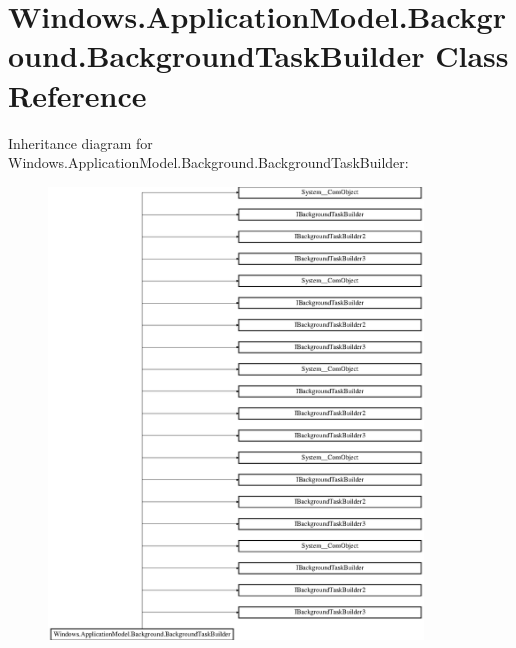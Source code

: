 \hypertarget{class_windows_1_1_application_model_1_1_background_1_1_background_task_builder}{}\section{Windows.\+Application\+Model.\+Background.\+Background\+Task\+Builder Class Reference}
\label{class_windows_1_1_application_model_1_1_background_1_1_background_task_builder}
Inheritance diagram for Windows.\+Application\+Model.\+Background.\+Background\+Task\+Builder\+:\begin{figure}[H]
\begin{center}
\leavevmode
\includegraphics[height=12.000000cm]{class_windows_1_1_application_model_1_1_background_1_1_background_task_builder}
\end{center}
\end{figure}
